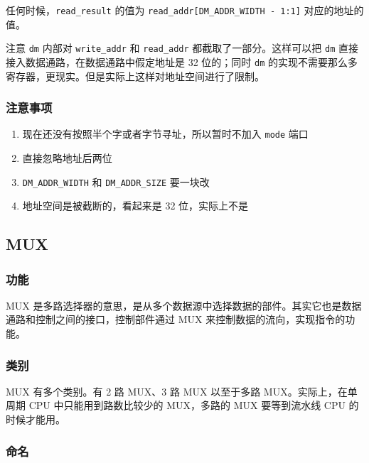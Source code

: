 任何时候，\texttt{read\_result} 的值为
\texttt{read\_addr{[}DM\_ADDR\_WIDTH\ -\ 1:1{]}} 对应的地址的值。

注意 \texttt{dm} 内部对 \texttt{write\_addr} 和 \texttt{read\_addr}
都截取了一部分。这样可以把 \texttt{dm}
直接接入数据通路，在数据通路中假定地址是 32 位的；同时 \texttt{dm}
的实现不需要那么多寄存器，更现实。但是实际上这样对地址空间进行了限制。

\hypertarget{ux6ce8ux610fux4e8bux9879-5}{%
\subsubsection{注意事项}\label{ux6ce8ux610fux4e8bux9879-5}}

\begin{enumerate}
\def\labelenumi{\arabic{enumi}.}
\tightlist
\item
  现在还没有按照半个字或者字节寻址，所以暂时不加入 \texttt{mode} 端口
\item
  直接忽略地址后两位
\item
  \texttt{DM\_ADDR\_WIDTH} 和 \texttt{DM\_ADDR\_SIZE} 要一块改
\item
  地址空间是被截断的，看起来是 32 位，实际上不是
\end{enumerate}

\hypertarget{mux}{%
\subsection{MUX}\label{mux}}

\hypertarget{ux529fux80fd-9}{%
\subsubsection{功能}\label{ux529fux80fd-9}}

MUX
是多路选择器的意思，是从多个数据源中选择数据的部件。其实它也是数据通路和控制之间的接口，控制部件通过
MUX 来控制数据的流向，实现指令的功能。

\hypertarget{ux7c7bux522b}{%
\subsubsection{类别}\label{ux7c7bux522b}}

MUX 有多个类别。有 2 路 MUX、3 路 MUX 以至于多路 MUX。实际上，在单周期
CPU 中只能用到路数比较少的 MUX，多路的 MUX 要等到流水线 CPU
的时候才能用。

\hypertarget{ux547dux540d}{%
\subsubsection{命名}\label{ux547dux540d}}

